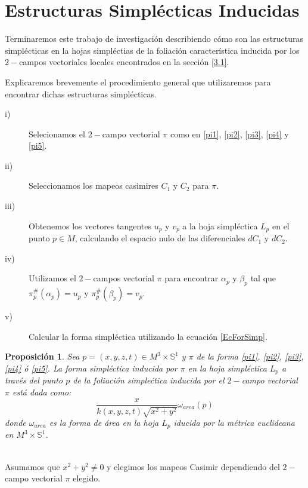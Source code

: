 \documentclass[a4paper,10pt]{book}
\newtheorem{propo}{Proposici\'on}[chapter]
\begin{document}
\section{Estructuras Simpl\'ecticas Inducidas}\label{3.3}
Terminaremos este trabajo de investigaci\'on describiendo c\'omo son las estructuras simpl\'ecticas en la hojas simpl\'ectias de la foliaci\'on caracter\'istica inducida por los $2-$campos vectoriales locales encontrados en la secci\'on \ref{3.1}.
\vspace{5mm}

Explicaremos brevemente el procedimiento general que utilizaremos para encontrar dichas estructuras simpl\'ecticas.

\begin{description}
    \item[i)] Selecionamos el $2-$campo vectorial $\pi$ como en \ref{pi1}, \ref{pi2}, \ref{pi3}, \ref{pi4} y \ref{pi5}.
    \item[ii)] Seleccionamos los mapeos casimires $C_{1}$ y $C_{2}$ para $\pi$.
    \item[iii)] Obtenemos los vectores tangentes $u_{p}$ y $v_{p}$ a la hoja simpl\'ectica $L_{p}$ en el punto $p\in M$, calculando el espacio nulo de las diferenciales $dC_{1}$ y $dC_{2}$.
    \item[iv)] Utilizamos el $2-$campos vectorial $\pi$ para encontrar $\alpha_{p}$ y $\beta_{p}$ tal que $\pi^{\#}_{p}(\alpha_{p})=u_{p}$ y $\pi^{\#}_{p}(\beta_{p})=v_{p}$.
     \item[v)] Calcular la forma simpl\'ectica utilizando la ecuaci\'on \ref{EcForSimp}. 
\end{description}

\begin{propo}
Sea $p=(x,y,z,t)\in M^{3}\times\mathbb{S}^{1}$ y $\pi$ de la forma \ref{pi1}, \ref{pi2}, \ref{pi3}, \ref{pi4} \'o \ref{pi5}. La forma simpl\'ectica inducida por $\pi$ en la hoja simpl\'ectica $L_{p}$ a trav\'es del punto $p$ de la foliaci\'on simple\'ctica inducida por el $2-$campo vectorial $\pi$ est\'a dada como:  
\begin{equation}\label{eqformasimplectica}
\frac{x}{k(x,y,z,t)\sqrt{x^{2}+y^{2}}}\omega_{area}(p)
\end{equation}
donde $\omega_{area}$ es la forma de \'area en la hoja $L_{p}$ iducida por la m\'etrica euclideana en $M^{3}\times\mathbb{S}^{1}$. 
\end{propo}
\\
Asumamos que $x^{2}+y^{2}\neq 0$ y elegimos los mapeos Casimir dependiendo del $2-$campo vectorial $\pi$ elegido.\\
\end{document}
